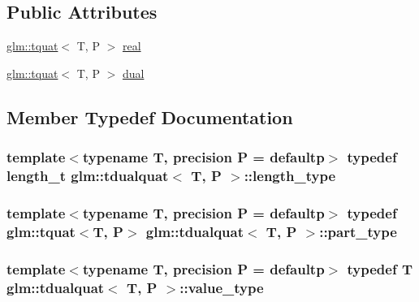 \subsection*{Public Attributes}
\begin{DoxyCompactItemize}
\item 
\hyperlink{structglm_1_1tquat}{glm\+::tquat}$<$ T, P $>$ \hyperlink{structglm_1_1tdualquat_a402b3ac8410bd71a27f811dced8db14e}{real}
\item 
\hyperlink{structglm_1_1tquat}{glm\+::tquat}$<$ T, P $>$ \hyperlink{structglm_1_1tdualquat_abeea1eb15f230d3bc50740c3811e1fd3}{dual}
\end{DoxyCompactItemize}


\subsection{Member Typedef Documentation}
\hypertarget{structglm_1_1tdualquat_a8100706ca94a1aa6611874787a9be0ca}{}
\subsubsection[{length\+\_\+type}]{\setlength{\rightskip}{0pt plus 5cm}template$<$typename T, precision P = defaultp$>$ typedef length\+\_\+t {\bf glm\+::tdualquat}$<$ T, P $>$\+::{\bf length\+\_\+type}}\label{structglm_1_1tdualquat_a8100706ca94a1aa6611874787a9be0ca}
\hypertarget{structglm_1_1tdualquat_a496a3e08262a28863cf7b0609eee7e5b}{}
\subsubsection[{part\+\_\+type}]{\setlength{\rightskip}{0pt plus 5cm}template$<$typename T, precision P = defaultp$>$ typedef {\bf glm\+::tquat}$<$T, P$>$ {\bf glm\+::tdualquat}$<$ T, P $>$\+::{\bf part\+\_\+type}}\label{structglm_1_1tdualquat_a496a3e08262a28863cf7b0609eee7e5b}
\hypertarget{structglm_1_1tdualquat_afcff3aadbc6e5c5672e2af653a5e401c}{}
\subsubsection[{value\+\_\+type}]{\setlength{\rightskip}{0pt plus 5cm}template$<$typename T, precision P = defaultp$>$ typedef T {\bf glm\+::tdualquat}$<$ T, P $>$\+::{\bf value\+\_\+type}}\label{structglm_1_1tdualquat_afcff3aadbc6e5c5672e2af653a5e401c}


